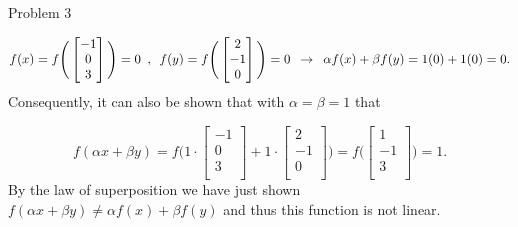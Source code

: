 \begin{problem}{Problem 3}
\begin{Highlight}
        \begin{equation}
            f(x) = f \Bigg(
                \begin{bmatrix}
                    -1 \\
                    0 \\ 
                    3 \\
                \end{bmatrix}
                \Bigg) = 0 \hspace*{5pt} , \hspace*{5pt}
            f(y) = f \Bigg(
                \begin{bmatrix}
                    2 \\
                    - 1 \\
                    0 \\
                \end{bmatrix}
                \Bigg) = 0 \hspace*{5pt} \rightarrow \hspace*{5pt} \alpha f(x) + \beta f(y) = 1(0) + 1(0) = 0.
        \end{equation}
        Consequently, it can also be shown that with $\alpha = \beta = 1$ that

        \begin{equation}
            f(\alpha x + \beta y) = f \Bigg(
                1 \cdot 
                \begin{bmatrix}
                    - 1 \\
                    0 \\
                    3 \\
                \end{bmatrix}
                + 1 \cdot 
                \begin{bmatrix}
                    2 \\
                    -1 \\
                    0 \\
                \end{bmatrix}
                \Bigg) = f \Bigg(
                \begin{bmatrix}
                    1 \\
                    -1 \\
                    3 \\
                \end{bmatrix}
                \Bigg ) = 1.
        \end{equation}
        By the law of superposition we have just shown $f(\alpha x + \beta y) \neq \alpha f(x) + \beta f(y)$ and thus this function is not linear.
    \end{Highlight}


\end{problem}
